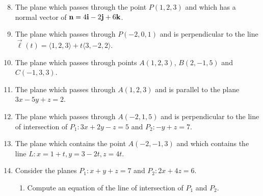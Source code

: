 \documentclass[12pt]{article}
\newif\ifans
\begin{document}

\begin{enumerate}
\setcounter{enumi}{7}

\item The plane which passes through the point $P(1,2,3)$ and which has a normal vector of ${\bf n}=4{\bf i}-2{\bf j}+6{\bf k}$.

\ifans{\fbox{$4(x-1)-2(y-2)+6(z-3)=0$}} \fi

\item The plane which passes through $P(-2,0,1)$ and is perpendicular to the line $\overrightarrow{\ell}(t)=\langle 1,2,3 \rangle +t \langle 3,-2,2\rangle$.

\ifans{\fbox{$3(x+2)-2y+2(z-1)=0$}} \fi

\item The plane which passes through points $A(1,2,3)$, $B(2,-1,5)$ and $C(-1,3,3)$.

\ifans{\fbox{$-2(x-1)-4(y-2)-5(z-3)=0$}} \fi

\item The plane which passes through $A(1,2,3)$ and is parallel to the plane $3x-5y+z=2$.

\ifans{\fbox{$3(x-1)-5(y-2)+1(z-3)=0$}} \fi

\item The plane which passes through $A(-2,1,5)$ and is perpendicular to the line of intersection of $P_1: 3x+2y-z=5$ and $P_2: -y+z=7$.

\ifans{\fbox{$1(x+2)-3(y-1)-3(z-5)=0$; Detailed Solution: \textcolor{blue}{\href{http://www.math.drexel.edu/classes/Calculus/resources/Math200HW/Solutions/06_200_Planes_12.pdf}{Here}}}} \fi

\item The plane which contains the point $A(-2,-1,3)$ and which contains the line $L: x=1+t, y=3-2t, z=4t$.

\ifans{\fbox{$2(x+2)-3(y+1)-2(z-3)=0$}} \fi

\item Consider the planes $P_1: x+y+z=7$ and $P_2: 2x+4z=6$.

\begin{enumerate}

\item Compute an equation of the line of intersection of $P_1$ and $P_2$.

\ifans{\fbox{\parbox{1\linewidth}{One parametric equation of the line of intersection is $L: x=3-2t, y=4+t, z=t$}}} \fi


\end{enumerate}
\end{enumerate}
\end{document}
